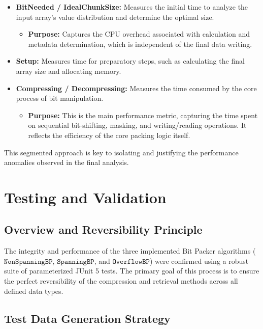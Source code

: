 \documentclass[11pt, a4paper]{article}
\begin{document}
	\begin{itemize}
		\item \textbf{BitNeeded / IdealChunkSize:} Measures the initial time to analyze the input array's value distribution and determine the optimal size.
		\begin{itemize}
			\item \textbf{Purpose:} Captures the CPU overhead associated with calculation and metadata determination, which is independent of the final data writing.
		\end{itemize}
		
		\item \textbf{Setup:} Measures time for preparatory steps, such as calculating the final array size and allocating memory.
		
		\item \textbf{Compressing / Decompressing:} Measures the time consumed by the core process of bit manipulation.
		\begin{itemize}
			\item \textbf{Purpose:} This is the main performance metric, capturing the time spent on sequential bit-shifting, masking, and writing/reading operations. It reflects the efficiency of the core packing logic itself.
		\end{itemize}
	\end{itemize}
	This segmented approach is key to isolating and justifying the performance anomalies observed in the final analysis.
	
	\section{Testing and Validation}
	\label{sec:testing_validation}
	
	\subsection{Overview and Reversibility Principle}
	\label{sec:overview_principle}
	
	The integrity and performance of the three implemented Bit Packer algorithms ($\texttt{NonSpanningBP}$, $\texttt{SpanningBP}$, and $\texttt{OverflowBP}$) were confirmed using a robust suite of parameterized JUnit 5 tests. The primary goal of this process is to ensure the perfect reversibility of the compression and retrieval methods across all defined data types.
	
	\subsection{Test Data Generation Strategy}
	\label{sec:data_generation_strategy}
	
\end{document}
